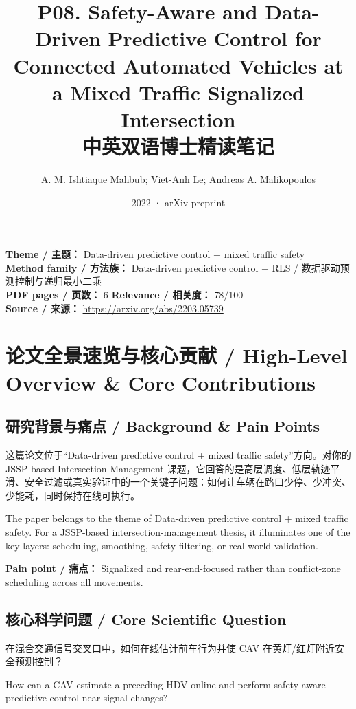 \documentclass[UTF8,a4paper,11pt,fontset=fandol]{ctexart}
\title{P08. Safety-Aware and Data-Driven Predictive Control for Connected Automated Vehicles at a Mixed Traffic Signalized Intersection\\中英双语博士精读笔记}
\author{A. M. Ishtiaque Mahbub; Viet-Anh Le; Andreas A. Malikopoulos}
\date{2022 · arXiv preprint}
\begin{document}
\maketitle

\noindent\textbf{Theme / 主题：} Data-driven predictive control + mixed traffic safety\\
\textbf{Method family / 方法族：} Data-driven predictive control + RLS / 数据驱动预测控制与递归最小二乘\\
\textbf{PDF pages / 页数：} 6 \quad
\textbf{Relevance / 相关度：} 78/100\\
\textbf{Source / 来源：} \url{https://arxiv.org/abs/2203.05739}

\section{论文全景速览与核心贡献 / High-Level Overview \& Core Contributions}
\subsection{研究背景与痛点 / Background \& Pain Points}
这篇论文位于“Data-driven predictive control + mixed traffic safety”方向。对你的 JSSP-based Intersection Management 课题，它回答的是高层调度、低层轨迹平滑、安全过滤或真实验证中的一个关键子问题：如何让车辆在路口少停、少冲突、少能耗，同时保持在线可执行。

The paper belongs to the theme of Data-driven predictive control + mixed traffic safety. For a JSSP-based intersection-management thesis, it illuminates one of the key layers: scheduling, smoothing, safety filtering, or real-world validation.

\textbf{Pain point / 痛点：} Signalized and rear-end-focused rather than conflict-zone scheduling across all movements.

\subsection{核心科学问题 / Core Scientific Question}
在混合交通信号交叉口中，如何在线估计前车行为并使 CAV 在黄灯/红灯附近安全预测控制？

How can a CAV estimate a preceding HDV online and perform safety-aware predictive control near signal changes?
\end{document}
